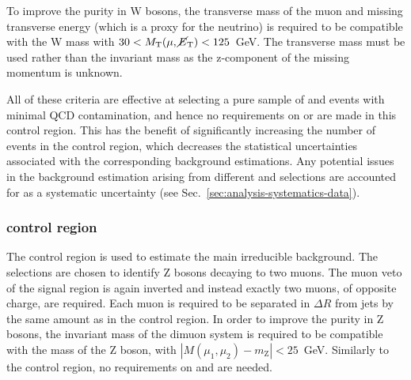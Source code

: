 To 
improve the purity in W bosons, the transverse mass of the muon and missing 
transverse energy (which 
is a proxy for the neutrino) is required to be compatible with the W mass with 
$30 < M_{\mathrm{T}}(\mu,\mbox{$\cancel{E}_\text{T}$}) < 125$~GeV. The transverse mass must be used 
rather than the invariant mass as the 
z-component of the missing momentum is unknown.

All of these 
criteria are effective at selecting a pure sample of \wlj and \ttbar events 
with minimal QCD contamination, and hence no requirements on \alphat or \bdphi 
are made in this control region. This has the benefit of significantly 
increasing the number of events in the control region, which decreases the 
statistical uncertainties associated with the corresponding background 
estimations. Any potential issues in the background estimation arising from 
different \alphat and \bdphi selections are accounted for as a systematic 
uncertainty (see Sec.~\ref{sec:analysis-systematics-data}).

\subsubsection{\mmj control region}

The \mmj control region is used to estimate the main irreducible \znnj 
background. The selections are chosen to identify Z bosons decaying to two 
muons. The muon veto of the signal region is again inverted and instead exactly 
two muons, of opposite charge, are required. Each muon is required to be 
separated in $\Delta R$ from jets by the same amount as in the \mj control 
region. In order to improve the purity in Z bosons, the invariant mass of the 
dimuon system is required to be compatible with the mass of the Z boson, with 
$|M(\mu_1,\mu_2) - m_\mathrm{Z}| < 25$~GeV. Similarly to the \mj control 
region, no requirements on \alphat and \bdphi are needed.



